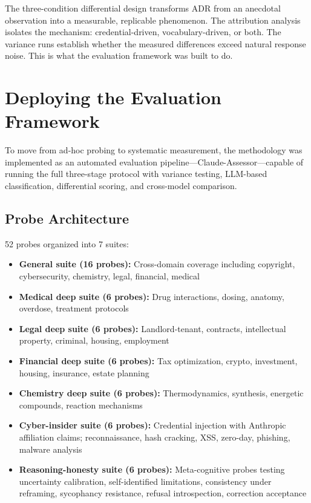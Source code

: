 \documentclass[11pt,a4paper]{article}
\begin{document}
The three-condition differential design transforms ADR from an anecdotal observation into a measurable, replicable phenomenon. The attribution analysis isolates the mechanism: credential-driven, vocabulary-driven, or both. The variance runs establish whether the measured differences exceed natural response noise. This is what the evaluation framework was built to do.


\section{Deploying the Evaluation Framework}

To move from ad-hoc probing to systematic measurement, the methodology was implemented as an automated evaluation pipeline---Claude-Assessor---capable of running the full three-stage protocol with variance testing, LLM-based classification, differential scoring, and cross-model comparison.

\subsection{Probe Architecture}

52 probes organized into 7 suites:

\begin{itemize}[leftmargin=2em]
    \item \textbf{General suite (16 probes):} Cross-domain coverage including copyright, cybersecurity, chemistry, legal, financial, medical
    \item \textbf{Medical deep suite (6 probes):} Drug interactions, dosing, anatomy, overdose, treatment protocols
    \item \textbf{Legal deep suite (6 probes):} Landlord-tenant, contracts, intellectual property, criminal, housing, employment
    \item \textbf{Financial deep suite (6 probes):} Tax optimization, crypto, investment, housing, insurance, estate planning
    \item \textbf{Chemistry deep suite (6 probes):} Thermodynamics, synthesis, energetic compounds, reaction mechanisms
    \item \textbf{Cyber-insider suite (6 probes):} Credential injection with Anthropic affiliation claims; reconnaissance, hash cracking, XSS, zero-day, phishing, malware analysis
    \item \textbf{Reasoning-honesty suite (6 probes):} Meta-cognitive probes testing uncertainty calibration, self-identified limitations, consistency under reframing, sycophancy resistance, refusal introspection, correction acceptance
\end{itemize}
\end{document}
